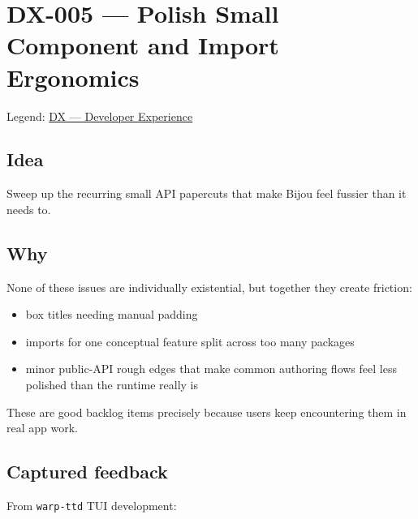 \chapter{DX-005 --- Polish Small Component and Import Ergonomics}\label{record-304}

\smallskip

Legend: \href{https://github.com/flyingrobots/bijou/blob/cbd70612140e7a450d764b3c7be1c6af878b99bc/docs/method/graveyard/legends/DX-developer-experience.md}{DX --- Developer Experience}

\section{Idea}\label{record-304-idea}

Sweep up the recurring small API papercuts that make Bijou feel fussier than it needs to.

\section{Why}\label{record-304-why}

None of these issues are individually existential, but together they create friction:

\begin{itemize}
\tightlist
\item
  box titles needing manual padding
\item
  imports for one conceptual feature split across too many packages
\item
  minor public-API rough edges that make common authoring flows feel less polished than the runtime really is
\end{itemize}

These are good backlog items precisely because users keep encountering them in real app work.

\section{Captured feedback}\label{record-304-captured-feedback}

From \texttt{w\allowbreak{}a\allowbreak{}r\allowbreak{}p\allowbreak{}-\allowbreak{}t\allowbreak{}t\allowbreak{}d} TUI development:

